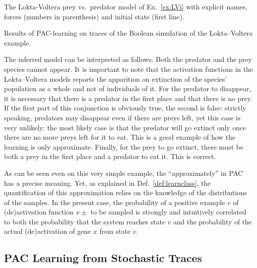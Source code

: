 \documentclass{llncs}
\begin{document}
\begin{listfig}[htp]
	
   \caption{The Lokta-Voltera prey vs.\ predator model of Ex.~\ref{ex:LVi}
   with explicit names, forces (numbers in parenthesis) and initial state
   (first line).\label{bool-LV}}
\end{listfig}
\begin{listfig}[htp]
	
	\caption{Results of PAC-learning on traces of the Boolean simulation of the
   Lokta--Voltera example.\label{bool-LV.res}}
\end{listfig}

The inferred model can be interpreted as follows.
%
Both the predator and the prey species cannot appear. It is important to note that the activation functions in the Lokta--Voltera models reports the apparition on extinction of the species' population as a whole and not of individuals of it.
%
For the predator to disappear, it is necessary that there is a predator in the first place and that there is no prey. If the first part of this conjunction is obviously true, the second is false: strictly speaking, predators may disappear even if there are preys left, yet this case is very unlikely: the most likely case is that the predator will go extinct only once there are no more preys left for it to eat. This is a good example of how the learning is only approximate.
%
Finally, for the prey to go extinct, there must be both a prey in the first place and a predator to eat it. This is correct.


As can be seen even on this very simple example, the ``approximately'' in PAC has a precise meaning. Yet, as explained in Def.~\ref{def:learnclass}, the quantification of this approximation relies on the knowledge of the distributions of the samples.
%
In the present case, the probability of a positive example $v$ of (de)activation function $x\pm$ to be sampled is strongly and intuitively correlated to both the probability that the system reaches state $v$ and the probability of the actual (de)activation of gene $x$ from state $v$. 


\subsection{PAC Learning from Stochastic Traces}
\end{document}
